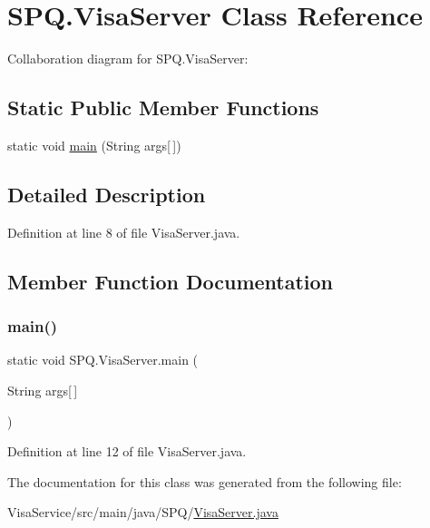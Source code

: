 \hypertarget{class_s_p_q_1_1_visa_server}{}\section{S\+P\+Q.\+Visa\+Server Class Reference}
\label{class_s_p_q_1_1_visa_server}


Collaboration diagram for S\+P\+Q.\+Visa\+Server\+:
\subsection*{Static Public Member Functions}
\begin{DoxyCompactItemize}
\item 
static void \mbox{\hyperlink{class_s_p_q_1_1_visa_server_adb71a2f4fb93f80faae22d928a2a5229}{main}} (String args\mbox{[}$\,$\mbox{]})
\end{DoxyCompactItemize}


\subsection{Detailed Description}


Definition at line 8 of file Visa\+Server.\+java.



\subsection{Member Function Documentation}
\mbox{\label{class_s_p_q_1_1_visa_server_adb71a2f4fb93f80faae22d928a2a5229}} 
\subsubsection{\texorpdfstring{main()}{main()}}
{\footnotesize\ttfamily static void S\+P\+Q.\+Visa\+Server.\+main (\begin{DoxyParamCaption}\item[{String}]{args\mbox{[}$\,$\mbox{]} }\end{DoxyParamCaption})\hspace{0.3cm}{\ttfamily [static]}}



Definition at line 12 of file Visa\+Server.\+java.



The documentation for this class was generated from the following file\+:\begin{DoxyCompactItemize}
\item 
Visa\+Service/src/main/java/\+S\+P\+Q/\mbox{\hyperlink{_visa_server_8java}{Visa\+Server.\+java}}\end{DoxyCompactItemize}
